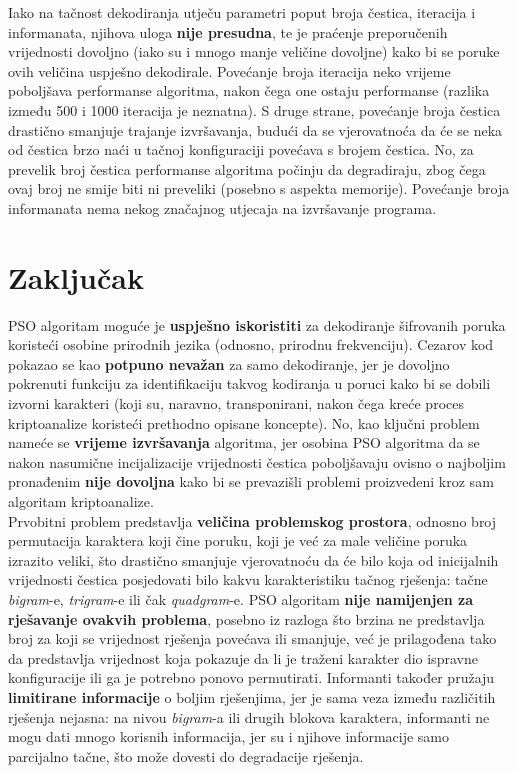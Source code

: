 \documentclass[12pt, a4paper]{article}
\begin{document}
Iako na tačnost dekodiranja utječu parametri poput broja čestica, iteracija i informanata, njihova uloga \textbf{nije presudna}, te je praćenje preporučenih vrijednosti dovoljno (iako su i mnogo manje veličine dovoljne) kako bi se poruke ovih veličina uspješno dekodirale. Povećanje broja iteracija neko vrijeme poboljšava performanse algoritma, nakon čega one ostaju performanse (razlika između 500 i 1000 iteracija je neznatna). S druge strane, povećanje broja čestica drastično smanjuje trajanje izvršavanja, budući da se vjerovatnoća da će se neka od čestica brzo naći u tačnoj konfiguraciji povećava s brojem čestica. No, za prevelik broj čestica performanse algoritma počinju da degradiraju, zbog čega ovaj broj ne smije biti ni preveliki (posebno s aspekta memorije). Povećanje broja informanata nema nekog značajnog utjecaja na izvršavanje programa.

\newpage

\section{Zaključak}

PSO algoritam moguće je \textbf{uspješno iskoristiti} za dekodiranje šifrovanih poruka koristeći osobine prirodnih jezika (odnosno, prirodnu frekvenciju). Cezarov kod pokazao se kao \textbf{potpuno nevažan} za samo dekodiranje, jer je dovoljno pokrenuti funkciju za identifikaciju takvog kodiranja u poruci kako bi se dobili izvorni karakteri (koji su, naravno, transponirani, nakon čega kreće proces kriptoanalize koristeći prethodno opisane koncepte). No, kao ključni problem nameće se \textbf{vrijeme izvršavanja} algoritma, jer osobina PSO algoritma da se nakon nasumične incijalizacije vrijednosti čestica poboljšavaju ovisno o najboljim pronađenim \textbf{nije dovoljna} kako bi se prevazišli problemi proizvedeni kroz sam algoritam kriptoanalize. \\

Prvobitni problem predstavlja \textbf{veličina problemskog prostora}, odnosno broj permutacija karaktera koji čine poruku, koji je već za male veličine poruka izrazito veliki, što drastično smanjuje vjerovatnoću da će bilo koja od inicijalnih vrijednosti čestica posjedovati bilo kakvu karakteristiku tačnog rješenja: tačne \textit{bigram}-e, \textit{trigram}-e ili čak \textit{quadgram}-e. PSO algoritam \textbf{nije namijenjen za rješavanje ovakvih problema}, posebno iz razloga što brzina ne predstavlja broj za koji se vrijednost rješenja povećava ili smanjuje, već je prilagođena tako da predstavlja vrijednost koja pokazuje da li je traženi karakter dio ispravne konfiguracije ili ga je potrebno ponovo permutirati. Informanti također pružaju \textbf{limitirane informacije} o boljim rješenjima, jer je sama veza između različitih rješenja nejasna: na nivou \textit{bigram}-a ili drugih blokova karaktera, informanti ne mogu dati mnogo korisnih informacija, jer su i njihove informacije samo parcijalno tačne, što može dovesti do degradacije rješenja. \\
\end{document}

